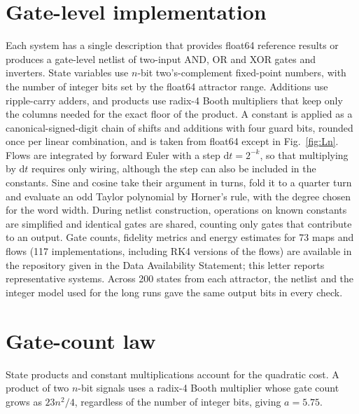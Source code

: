 \documentclass[ASNA,twocolumn]{USG}
\begin{document}
\section{Gate-level implementation}\label{sec:impl}
Each system has a single description that provides float64 reference results
or produces a gate-level netlist of two-input AND, OR and XOR gates and inverters. State variables use
$n$-bit two's-complement fixed-point numbers, with the number of integer bits set by
the float64 attractor range. Additions use ripple-carry adders, and
products use radix-4 Booth multipliers that keep only the columns needed for the exact
floor of the product. A constant is applied as a canonical-signed-digit chain of shifts
and additions with four guard bits, rounded once per linear combination, and is taken
from float64 except in Fig.~\ref{fig:Ln}. Flows are
integrated by forward Euler with a step $\mathrm{d}t = 2^{-k}$, so that multiplying by
$\mathrm{d}t$ requires only wiring, although the step can also be included in the constants.
Sine and
cosine take their argument in turns, fold it to a quarter turn and evaluate an odd
Taylor polynomial by Horner's rule, with the degree chosen for the word width.
During netlist construction,
operations on known constants are simplified and identical gates are shared,
counting only gates that contribute to an output.
Gate counts, fidelity metrics and energy estimates for 73 maps and flows
(117 implementations, including RK4 versions of the flows) are available in the
repository given in the Data Availability Statement; this letter reports
representative systems. Across 200 states from each
attractor, the netlist and the integer model used for the long runs
gave the same output bits in every check.

\section{Gate-count law}\label{sec:law}
State products and constant multiplications account for the quadratic cost.
A product of two $n$-bit signals uses a radix-4 Booth multiplier whose gate count
grows as $23n^2/4$, regardless of the number of integer bits, giving $a = 5.75$.
\end{document}

